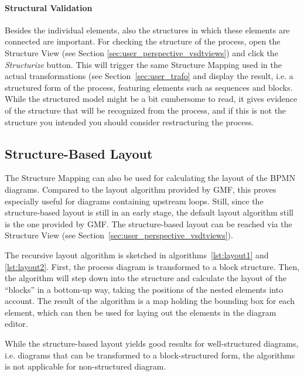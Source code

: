 \paragraph{Structural Validation}
Besides the individual elements, also the structures in which these elements are
connected are important.  For checking the structure of the process, open the
Structure View (see Section \ref{sec:user_perspective_vsdtviews}) and click the
\emph{Structurize} button.  This will trigger the same Structure Mapping used in
the actual transformations (see Section~\ref{sec:user_trafo} and display the result,
i.e. a structured form of the process, featuring elements such as sequences and
blocks.  While the structured model might be a bit cumbersome to read, it gives
evidence of the structure that will be recognized from the process, and if this
is not the structure you intended you should consider restructuring the process.



\subsection{Structure-Based Layout}

The Structure Mapping can also be used for calculating the layout of the BPMN
diagrams.  Compared to the layout algorithm provided by GMF, this proves especially
useful for diagrams containing upstream loops.  Still, since the structure-based
layout is still in an early stage, the default layout algorithm still is the one
provided by GMF.  The structure-based layout can be reached via the Structure
View (see Section~\ref{sec:user_perspective_vsdtviews}).

The recursive layout algorithm is sketched in algorithms~\ref{lst:layout1} and
\ref{lst:layout2}.  First, the process diagram is transformed to a block structure.
Then, the algorithm will step down into the structure and calculate the layout of
the ``blocks'' in a bottom-up way, taking the positions of the nested elements
into account.  The result of the algorithm is a map holding the bounding box for
each element, which can then be used for laying out the elements in the diagram
editor.

While the structure-based layout yields good results for well-structured diagrams,
i.e. diagrams that can be transformed to a block-structured form, the algorithms
is not applicable for non-structured diagram.

